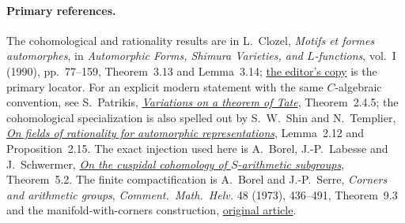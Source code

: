 \paragraph{Primary references.}
The cohomological and rationality results are in
L.~Clozel, \emph{Motifs et formes automorphes}, in
\emph{Automorphic Forms, Shimura Varieties, and
$L$-functions}, vol.~I (1990), pp.~77--159,
Theorem~3.13 and Lemma~3.14;
\href{https://www.jmilne.org/math/Books/AA1988a.pdf}
{the editor's copy} is the primary locator.
For an explicit modern statement with the same
$C$-algebraic convention, see S.~Patrikis,
\href{https://people.math.osu.edu/patrikis.1/variationsrevision.pdf}
{\emph{Variations on a theorem of Tate}},
Theorem~2.4.5; the cohomological specialization is also
spelled out by S.~W.~Shin and N.~Templier,
\href{https://math.berkeley.edu/~swshin/FieldRat.pdf}
{\emph{On fields of rationality for automorphic
representations}}, Lemma~2.12 and Proposition~2.15.
The exact injection used here is A.~Borel,
J.-P.~Labesse and J.~Schwermer,
\href{https://www.numdam.org/item/CM_1996__102_1_1_0.pdf}
{\emph{On the cuspidal cohomology of $S$-arithmetic
subgroups}}, Theorem~5.2.
The finite compactification is A.~Borel and J.-P.~Serre,
\emph{Corners and arithmetic groups},
\emph{Comment.~Math.~Helv.} 48 (1973), 436--491,
Theorem~9.3 and the manifold-with-corners construction,
\href{https://doi.org/10.1007/BF02566134}{original article}.

